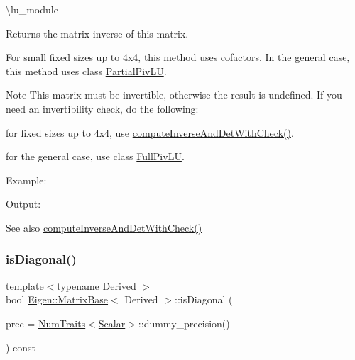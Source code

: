 \textbackslash{}lu\+\_\+module

\begin{DoxyReturn}{Returns}
the matrix inverse of this matrix.
\end{DoxyReturn}
For small fixed sizes up to 4x4, this method uses cofactors. In the general case, this method uses class \mbox{\hyperlink{class_eigen_1_1_partial_piv_l_u}{Partial\+Piv\+LU}}.

\begin{DoxyNote}{Note}
This matrix must be invertible, otherwise the result is undefined. If you need an invertibility check, do the following\+: \begin{DoxyItemize}
\item for fixed sizes up to 4x4, use \mbox{\hyperlink{class_eigen_1_1_matrix_base_a7baaf2fdec0191a2166cf9fd84a2dcb2}{compute\+Inverse\+And\+Det\+With\+Check()}}. \item for the general case, use class \mbox{\hyperlink{class_eigen_1_1_full_piv_l_u}{Full\+Piv\+LU}}.\end{DoxyItemize}
Example\+: 
\begin{DoxyCodeInclude}{0}
\end{DoxyCodeInclude}
 Output\+: 
\begin{DoxyVerbInclude}
\end{DoxyVerbInclude}

\end{DoxyNote}
\begin{DoxySeeAlso}{See also}
\mbox{\hyperlink{class_eigen_1_1_matrix_base_a7baaf2fdec0191a2166cf9fd84a2dcb2}{compute\+Inverse\+And\+Det\+With\+Check()}} 
\end{DoxySeeAlso}
\mbox{\label{class_eigen_1_1_matrix_base_a97027ea54c8cd1ddb1c578fee5cedc67}} 
\subsubsection{\texorpdfstring{isDiagonal()}{isDiagonal()}}
{\footnotesize\ttfamily template$<$typename Derived $>$ \\
bool \mbox{\hyperlink{class_eigen_1_1_matrix_base}{Eigen\+::\+Matrix\+Base}}$<$ Derived $>$\+::is\+Diagonal (\begin{DoxyParamCaption}\item[{const Real\+Scalar \&}]{prec = {\ttfamily \mbox{\hyperlink{struct_eigen_1_1_num_traits}{Num\+Traits}}$<$\mbox{\hyperlink{class_eigen_1_1_dense_base_a5feed465b3a8e60c47e73ecce83e39a2}{Scalar}}$>$\+:\+:dummy\+\_\+precision()} }\end{DoxyParamCaption}) const}

